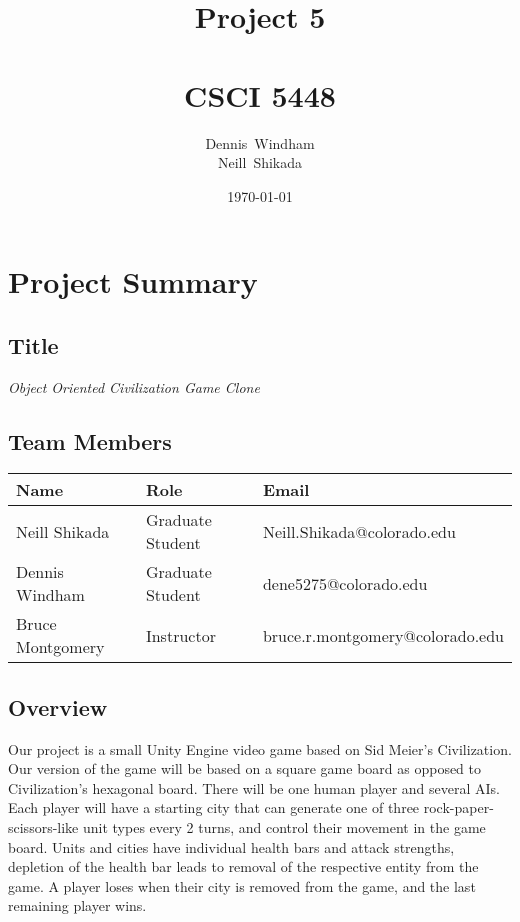 \documentclass[11pt]{amsart}
\def \fnamea{Dennis}
\def \fnameb{Neill}
\def \lnamea{Windham}
\def \lnameb{Shikada}
\def \class{CSCI 5448}
\def \hwnum{5} %
\def \assgn{Project \hwnum}
\begin{document}
\author[\lnamea]{\fnamea\ \lnamea\\\fnameb\ \lnameb}
\date{\today}
\title[\assgn]{\assgn \\ \ \\\class}
\maketitle
\tableofcontents

\newpage
\section*{\textbf{Project Summary}}
\subsection*{Title}
\begin{center}
    \textit{Object Oriented Civilization Game Clone}
\end{center}

\subsection*{Team Members} \phantom{}

\begin{table}[htbp]
    \begin{tabularx}{\textwidth}{l|l|l}
        \textbf{Name}    & \textbf{Role} & \textbf{Email} \\
        \hline
        Neill Shikada    & Graduate Student & Neill.Shikada@colorado.edu
        \\
        Dennis Windham   & Graduate Student & dene5275@colorado.edu  \\
        Bruce Montgomery & Instructor & bruce.r.montgomery@colorado.edu 
    \end{tabularx}
\end{table}

\subsection*{Overview} \phantom{}

Our project is a small Unity Engine video game based on Sid Meier's Civilization. Our version of the game will be based on a square game board as opposed to Civilization's hexagonal board. There will be one human player and several AIs. Each player will have a starting city that can generate one of three rock-paper-scissors-like unit types every 2 turns, and control their movement in the game board. Units and cities have individual health bars and attack strengths, depletion of the health bar leads to removal of the respective entity from the game. A player loses when their city is removed from the game, and the last remaining player wins.
\end{document}
